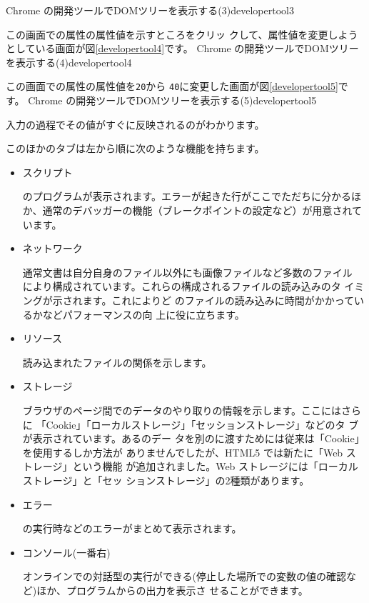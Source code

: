 {Chrome の開発ツールでDOMツリーを表示する(3)}{developertool3}

\newpage
この画面での属性の属性値を示すところをクリッ
クして、属性値を変更しようとしている画面が図\ref{developertool4}です。
{Chrome の開発ツールでDOMツリーを表示する(4)}{developertool4}

この画面での属性の属性値を\texttt{20}から
\texttt{40}に変更した画面が図\ref{developertool5}です。
{Chrome の開発ツールでDOMツリーを表示する(5)}{developertool5}

入力の過程でその値がすぐに反映されるのがわかります。

このほかのタブは左から順に次のような機能を持ちます。
\begin{itemize}
 \item スクリプト

\JS のプログラムが表示されます。エラーが起きた行がここでただちに分かるほ
       か、通常のデバッガーの機能（ブレークポイントの設定など）が用意されています。
 \item ネットワーク

通常\HTML 文書は自分自身のファイル以外にも画像ファイルなど多数のファイル
       により構成されています。これらの構成されるファイルの読み込みのタ
       イミングが示されます。これによりど
       のファイルの読み込みに時間がかかっているかなどパフォーマンスの向
       上に役に立ちます。
 \item リソース

読み込まれたファイルの関係を示します。
 \item ストレージ

ブラウザのページ間でのデータのやり取りの情報を示します。ここにはさらに
       「Cookie」「ローカルストレージ」「セッションストレージ」などのタ
       ブが表示されています。ある\HTML のデー
       タを別の\HTML に渡すためには従来は「Cookie」を使用するしか方法が
       ありませんでしたが、HTML5 では新たに「Web ストレージ」という機能
       が追加されました。Web ストレージには「ローカルストレージ」と「セッ
       ションストレージ」の2種類があります。
 \item エラー

\JS の実行時などのエラーがまとめて表示されます。
 \item コンソール(一番右)

オンラインで\JS の対話型の実行ができる(停止した場所での変数の値の確認な
       ど)ほか、プログラムからの出力を表示さ
       せることができます。
\end{itemize}

